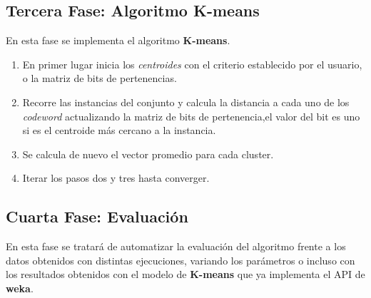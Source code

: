 \documentclass[10pt,a4paper]{article}
\begin{document}
\subsection*{Tercera Fase: Algoritmo K-means}

En esta fase se implementa el algoritmo \textbf{K-means}.
\begin{enumerate}
	\item En primer lugar inicia los \textit{centroides} con el criterio establecido por el usuario, o la matriz de bits de pertenencias.
	\item Recorre las instancias del conjunto y calcula la distancia a cada uno de los \textit{codeword} actualizando la matriz de bits de pertenencia,el valor 		del bit es uno si es el centroide más cercano a la instancia.
	\item Se calcula de nuevo el vector promedio para cada cluster.
	\item Iterar los pasos dos y tres hasta converger.
\end{enumerate}

\subsection*{Cuarta Fase: Evaluación}

En esta fase se tratará de automatizar la evaluación del algoritmo frente a los datos obtenidos con distintas ejecuciones, variando los parámetros o incluso con  
los resultados obtenidos con el modelo de \textbf{K-means} que ya implementa el API de \textbf{weka}.
\end{document}
